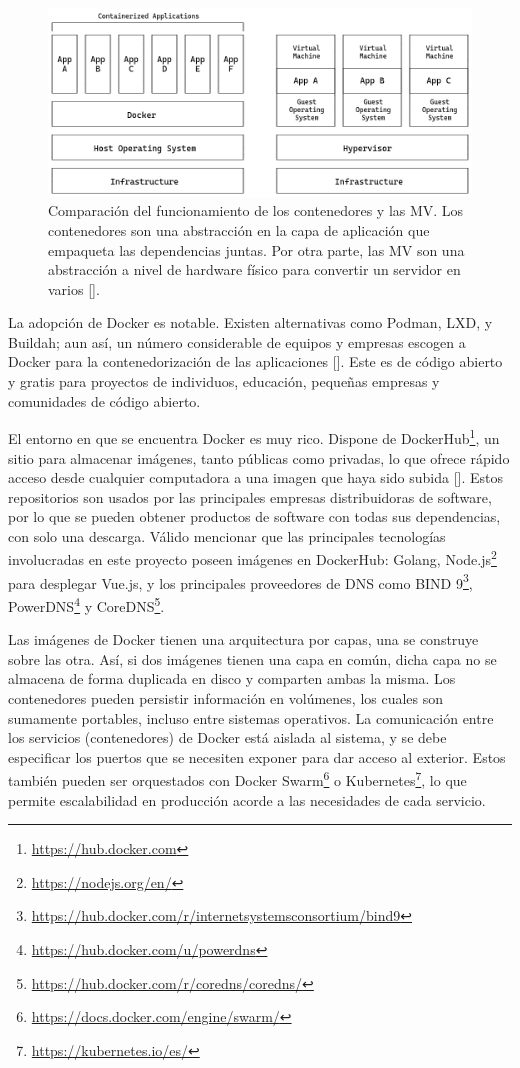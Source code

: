 \begin{figure}[!ht]
    \centering
    \includegraphics[width=\linewidth]{draws/cont-vs-vm.png}
    \caption{Comparación del funcionamiento de los contenedores y las MV. Los contenedores son una abstracción en la capa de aplicación que empaqueta las dependencias juntas. Por otra parte, las MV son una abstracción a nivel de hardware físico para convertir un servidor en varios [\cite{docker-containers}].}
\end{figure}


La adopción de Docker es notable. Existen alternativas como Podman, LXD, y Buildah; aun así, un número considerable de equipos y empresas escogen a Docker para la contenedorización de las aplicaciones [\cite{docker-usage}]. Este es de código abierto y gratis para proyectos de individuos, educación, pequeñas empresas y comunidades de código abierto.

El entorno en que se encuentra Docker es muy rico. Dispone de DockerHub\footnote{\url{https://hub.docker.com}}, un sitio para almacenar imágenes, tanto públicas como privadas, lo que ofrece rápido acceso desde cualquier computadora a una imagen que haya sido subida [\cite{merkel2014docker}]. Estos repositorios son usados por las principales empresas distribuidoras de software, por lo que se pueden obtener productos de software con todas sus dependencias, con solo una descarga. Válido mencionar que las principales tecnologías involucradas en este proyecto poseen imágenes en DockerHub: Golang, Node.js\footnote{\url{https://nodejs.org/en/}} para desplegar Vue.js, y los principales proveedores de DNS como BIND 9\footnote{\url{https://hub.docker.com/r/internetsystemsconsortium/bind9}}, PowerDNS\footnote{\url{https://hub.docker.com/u/powerdns}} y CoreDNS\footnote{\url{https://hub.docker.com/r/coredns/coredns/}}.

Las imágenes de Docker tienen una arquitectura por capas, una se construye sobre las otra. Así, si dos imágenes tienen una capa en común, dicha capa no se almacena de forma duplicada en disco y comparten ambas la misma. Los contenedores pueden persistir información en volúmenes, los cuales son sumamente portables, incluso entre sistemas operativos. La comunicación entre los servicios (contenedores) de Docker está aislada al sistema, y se debe especificar los puertos que se necesiten exponer para dar acceso al exterior. Estos también pueden ser orquestados con Docker Swarm\footnote{\url{https://docs.docker.com/engine/swarm/}} o Kubernetes\footnote{\url{https://kubernetes.io/es/}}, lo que permite escalabilidad en producción acorde a las necesidades de cada servicio.

